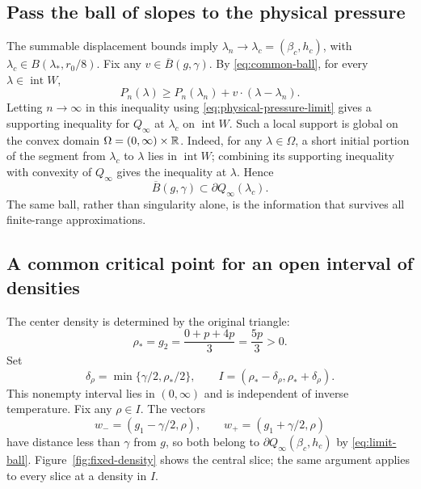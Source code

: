 \subsection{Pass the ball of slopes to the physical pressure}
The summable displacement bounds imply
$\lambda_n\to\lambda_c=(\beta_c,h_c)$, with
$\lambda_c\in B(\lambda_*,r_0/8)$.
Fix any $v\in\overline B(g,\gamma)$.
By \eqref{eq:common-ball}, for every $\lambda\in\operatorname{int}W$,
\[
 P_n(\lambda)\ge P_n(\lambda_n)+v\cdot(\lambda-\lambda_n).
\]
Letting $n\to\infty$ in this inequality using
\eqref{eq:physical-pressure-limit} gives a supporting inequality for
$Q_\infty$ at $\lambda_c$ on $\operatorname{int}W$.
Such a local support is global on the convex domain
$\Omega=(0,\infty)\times\mathbb R$. Indeed, for any $\lambda\in\Omega$, a short
initial portion of the segment from $\lambda_c$ to $\lambda$ lies in
$\operatorname{int}W$; combining its supporting inequality with convexity
of $Q_\infty$ gives the inequality at $\lambda$. Hence
\begin{equation}\label{eq:limit-ball}
 \overline B(g,\gamma)\subset\partial Q_\infty(\lambda_c).
\end{equation}
The same ball, rather than singularity alone, is the information that survives
all finite-range approximations.

\subsection{A common critical point for an open interval of densities}
The center density is determined by the original triangle:
\begin{equation}\label{eq:fixed-density}
 \rho_*=g_2=\frac{0+p+4p}{3}=\frac{5p}{3}>0.
\end{equation}
Set
\[
 \delta_\rho=\min\{\gamma/2,\rho_*/2\},\qquad
 I=(\rho_*-\delta_\rho,\rho_*+\delta_\rho).
\]
This nonempty interval lies in $(0,\infty)$ and is independent of inverse
temperature. Fix any $\rho\in I$. The vectors
\[
 w_-=(g_1-\gamma/2,\rho),\qquad
 w_+=(g_1+\gamma/2,\rho)
\]
have distance less than $\gamma$ from $g$, so both belong to
$\partial Q_\infty(\beta_c,h_c)$ by \eqref{eq:limit-ball}.
Figure~\ref{fig:fixed-density} shows the central slice; the same argument
applies to every slice at a density in $I$.

